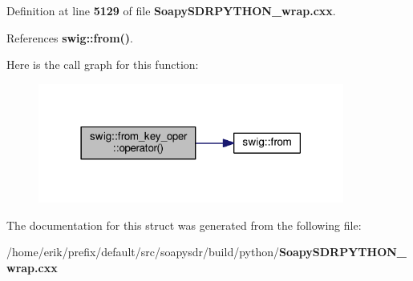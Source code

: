 Definition at line {\bf 5129} of file {\bf Soapy\+S\+D\+R\+P\+Y\+T\+H\+O\+N\+\_\+wrap.\+cxx}.



References {\bf swig\+::from()}.



Here is the call graph for this function\+:
\nopagebreak
\begin{figure}[H]
\begin{center}
\leavevmode
\includegraphics[width=285pt]{d2/dbe/structswig_1_1from__key__oper_af817d37f308de676ccf44069165deb2e_cgraph}
\end{center}
\end{figure}




The documentation for this struct was generated from the following file\+:\begin{DoxyCompactItemize}
\item 
/home/erik/prefix/default/src/soapysdr/build/python/{\bf Soapy\+S\+D\+R\+P\+Y\+T\+H\+O\+N\+\_\+wrap.\+cxx}\end{DoxyCompactItemize}
